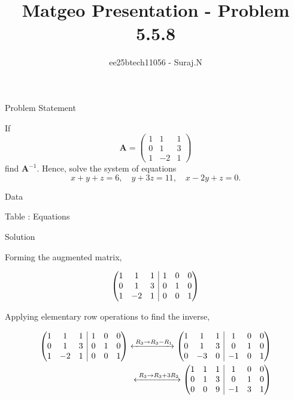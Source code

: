 \documentclass{beamer}
\title{Matgeo Presentation - Problem 5.5.8}
\author{ee25btech11056 - Suraj.N}
\makeatletter
\numberwithin{equation}{section}
\theoremstyle{remark}
\newcommand{\myvec}[1]{\ensuremath{\begin{pmatrix}#1\end{pmatrix}}}
\newenvironment{amatrix}[1]{%
  \left(\begin{array}{@{}*{#1}{c}|*{#1}{c}@{}}
}{%
  \end{array}\right)
}
\newcommand{\myaugvec}[2]{\ensuremath{\begin{amatrix}{#1}#2\end{amatrix}}}
\let\vec\mathbf
\makeatother
\begin{document}
\begin{frame}
  \titlepage
\end{frame}

\begin{frame}{Problem Statement}

If 
\[
\vec{A} = \myvec{1 & 1 & 1 \\ 0 & 1 & 3 \\ 1 & -2 & 1}
\]
find $\vec{A}^{-1}$. Hence, solve the system of equations
\[
x+y+z=6,\quad y+3z=11,\quad x-2y+z=0.
\]
\end{frame}

\begin{frame}{Data}

\begin{table}[h!]
  \centering
  
  \caption*{Table : Equations}
  \label{5.2.58}
\end{table}

\end{frame}

\begin{frame}{Solution}

Forming the augmented matrix,

\begin{align}
  \myaugvec{3}{1 & 1 & 1 & 1 & 0 & 0\\0 & 1 & 3 & 0 & 1 & 0\\1 & -2 & 1 & 0 & 0 & 1 }
\end{align}

Applying elementary row operations to find the inverse,

\begin{align}
\myaugvec{3}{1 & 1 & 1 & 1 & 0 & 0\\0 & 1 & 3 & 0 & 1 & 0\\1 & -2 & 1 & 0 & 0 & 1 }
\xleftrightarrow{\;R_3 \to R_3 - R_1}
\myaugvec{3}{1 & 1 & 1 & 1 & 0 & 0\\0 & 1 & 3 & 0 & 1 & 0\\0 & -3 & 0 & -1 & 0 & 1 }\\
\xleftrightarrow{\;R_3 \to R_3 + 3R_2}
\myaugvec{3}{1 & 1 & 1 & 1 & 0 & 0\\0 & 1 & 3 & 0 & 1 & 0\\0 & 0 & 9 & -1 & 3 & 1 }
\end{align}

\end{frame}
\end{document}
